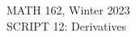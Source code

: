 \documentclass[11pt]{article}
\renewcommand{\_}[1]{\underline{ #1 }}
\newcommand{\head}[1]{
	\begin{center}
		{\large #1}
		\vspace{.2 in}
	\end{center}
	
	\bigskip 
}
\theoremstyle{definition}
\numberwithin{equation}{subsection}
\begin{document}
	
\head{MATH 162, Winter 2023\\
SCRIPT 12: Derivatives}

\setcounter{section}{12} 
\end{document}
